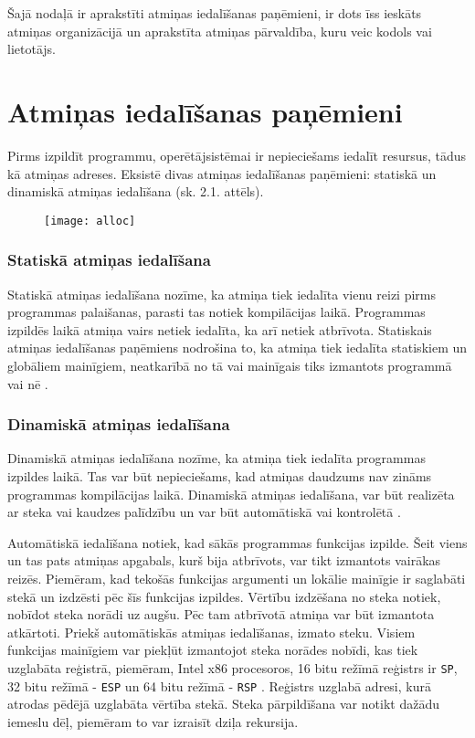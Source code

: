 ﻿Šajā nodaļā ir aprakstīti atmiņas iedalīšanas paņēmieni, ir dots īss ieskāts atmiņas organizācijā un aprakstīta atmiņas pārvaldība, kuru veic kodols vai lietotājs.
\section{Atmiņas iedalīšanas paņēmieni}

Pirms izpildīt programmu, operētājsistēmai ir nepieciešams iedalīt resursus, tādus kā atmiņas adreses.  
Eksistē divas atmiņas iedalīšanas paņēmieni: statiskā un dinamiskā atmiņas iedalīšana (sk. 2.1. attēls). 

\begin{figure}[h]
\begin{center}
\texttt{[image: alloc]}
\end{center}
\caption{\textbf{\fontsize{11}{12}\selectfont {Atmiņas iedalīšanas paņēmienu klasifikācija}}}
\label{fig:alloc}
\end{figure}


\subsubsection{Statiskā atmiņas iedalīšana}
Statiskā atmiņas iedalīšana nozīme, ka atmiņa tiek iedalīta vienu reizi pirms programmas palaišanas, parasti tas notiek kompilācijas laikā.
Programmas izpildēs laikā atmiņa vairs netiek iedalīta, ka arī netiek atbrīvota. 
Statiskais atmiņas iedalīšanas paņēmiens nodrošina to, ka atmiņa tiek iedalīta statiskiem un globāliem mainīgiem, neatkarībā no tā vai mainīgais tiks izmantots programmā vai nē \cite{mem_alloc}.

\subsubsection{Dinamiskā atmiņas iedalīšana}
Dinamiskā atmiņas iedalīšana nozīme, ka atmiņa tiek iedalīta programmas izpildes laikā.
Tas var būt nepieciešams, kad atmiņas daudzums nav zināms programmas kompilācijas laikā. 
Dinamiskā atmiņas iedalīšana, var būt realizēta ar steka vai kaudzes palīdzību un var būt automātiskā vai kontrolētā \cite{SDMA}.

Automātiskā iedalīšana notiek, kad sākās programmas funkcijas izpilde. 
Šeit viens un tas pats atmiņas apgabals, kurš bija atbrīvots, var tikt izmantots  vairākas reizēs. 
Piemēram, kad tekošās funkcijas argumenti un lokālie mainīgie ir saglabāti stekā un izdzēsti pēc šīs funkcijas izpildes. 
Vērtību izdzēšana no steka notiek, nobīdot steka norādi uz augšu.
Pēc tam atbrīvotā atmiņa var būt izmantota atkārtoti. 
Priekš automātiskās atmiņas iedalīšanas, izmato steku.
Visiem funkcijas mainīgiem var piekļūt izmantojot steka norādes nobīdi, kas tiek uzglabāta reģistrā, piemēram,  
Intel x86 procesoros, 16 bitu režīmā reģistrs ir \texttt{SP}, 32 bitu režīmā - \texttt{ESP} un 64 bitu režīmā - \texttt{RSP} \cite{JCL}.
Reģistrs uzglabā adresi, kurā atrodas pēdējā uzglabāta vērtība stekā.
Steka pārpildīšana var notikt dažādu iemeslu dēļ, piemēram to var izraisīt dziļa rekursija.
 
